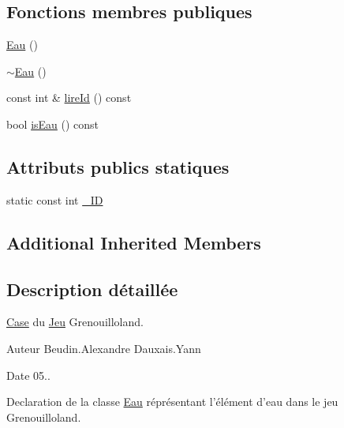 \subsection*{Fonctions membres publiques}
\begin{DoxyCompactItemize}
\item 
\hyperlink{classgrenouilloland_1_1Eau_aeebcde96afd822158f1c5f5daee8b67b}{Eau} ()
\item 
\hyperlink{classgrenouilloland_1_1Eau_aa7620d18dc4dcc19ebcfb2cd44cf788d}{$\sim$\-Eau} ()
\item 
const int \& \hyperlink{classgrenouilloland_1_1Eau_a649c33d717a7bec06683a18cbd13bd52}{lire\-Id} () const 
\item 
bool \hyperlink{classgrenouilloland_1_1Eau_afddd34ea4f2babcfe78b1be9dfd2f7af}{is\-Eau} () const 
\end{DoxyCompactItemize}
\subsection*{Attributs publics statiques}
\begin{DoxyCompactItemize}
\item 
static const int \hyperlink{classgrenouilloland_1_1Eau_af354ad9fa95f55695d0463a8cc2cbcb0}{\-\_\-\-I\-D}
\end{DoxyCompactItemize}
\subsection*{Additional Inherited Members}


\subsection{Description détaillée}
\hyperlink{classgrenouilloland_1_1Case}{Case} du \hyperlink{classgrenouilloland_1_1Jeu}{Jeu} Grenouilloland. 

\begin{DoxyAuthor}{Auteur}
Beudin.\-Alexandre Dauxais.\-Yann 
\end{DoxyAuthor}
\begin{DoxyDate}{Date}
05..
\end{DoxyDate}
Declaration de la classe \hyperlink{classgrenouilloland_1_1Eau}{Eau} réprésentant l'élément d'eau dans le jeu Grenouilloland. 

